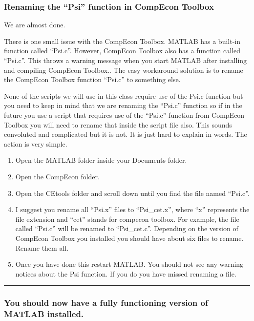 \documentclass[
]{article}
\begin{document}
\hypertarget{renaming-the-psi-function-in-compecon-toolbox}{%
\subsubsection{Renaming the ``Psi'' function in CompEcon
Toolbox}\label{renaming-the-psi-function-in-compecon-toolbox}}

We are almost done.

There is one small issue with the CompEcon Toolbox. MATLAB has a
built-in function called ``Psi.c''. However, CompEcon Toolbox also has a
function called ``Psi.c''. This throws a warning message when you start
MATLAB after installing and compiling CompEcon Toolbox.. The easy
workaround solution is to rename the CompEcon Toolbox function ``Psi.c''
to something else.

None of the scripts we will use in this class require use of the Psi.c
function but you need to keep in mind that we are renaming the ``Psi.c''
function so if in the future you use a script that requires use of the
``Psi.c'' function from CompEcon Toolbox you will need to rename that
inside the script file also. This sounds convoluted and complicated but
it is not. It is just hard to explain in words. The action is very
simple.

\begin{enumerate}
\def\labelenumi{\arabic{enumi}.}
\item
  Open the MATLAB folder inside your Documents folder.
\item
  Open the CompEcon folder.
\item
  Open the CEtools folder and scroll down until you find the file named
  ``Psi.c''.
\item
  I suggest you rename all ``Psi.x'' files to ``Psi\_cet.x'', where
  ``x'' represents the file extension and ``cet'' stands for compecon
  toolbox. For example, the file called ``Psi.c'' will be renamed to
  ``Psi\_cet.c''. Depending on the version of CompEcon Toolbox you
  installed you should have about six files to rename. Rename them all.
\item
  Once you have done this restart MATLAB. You should not see any warning
  notices about the Psi function. If you do you have missed renaming a
  file.
\end{enumerate}

\begin{center}\rule{0.5\linewidth}{0.5pt}\end{center}

\hypertarget{you-should-now-have-a-fully-functioning-version-of-matlab-installed.}{%
\subsubsection{You should now have a fully functioning version of MATLAB
installed.}\label{you-should-now-have-a-fully-functioning-version-of-matlab-installed.}}
\end{document}
